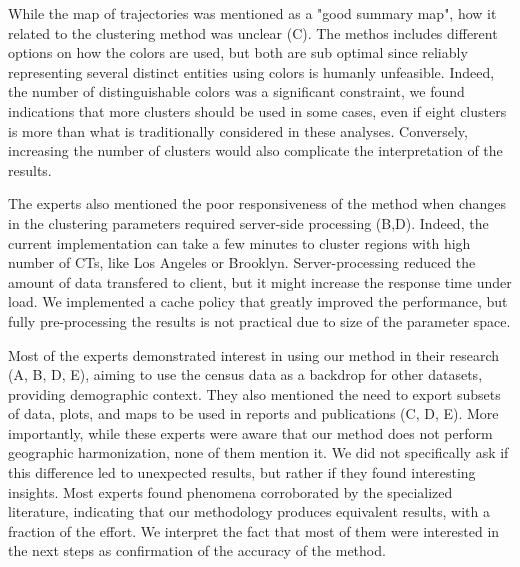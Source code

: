 While the map of trajectories was mentioned as a "good summary map", how it
related to the clustering method was unclear (C). The methos includes different
options on how the colors are used, but both are sub optimal since reliably
representing several distinct entities using colors is humanly unfeasible.
Indeed, the number of distinguishable colors was a significant constraint, we
found indications that more clusters should be used in some cases, even if eight
clusters is more than what is traditionally considered in these analyses.
Conversely, increasing the number of clusters would also complicate the
interpretation of the results.


The experts also mentioned the poor responsiveness of the method when changes in
the clustering parameters required server-side processing (B,D). Indeed, the
current implementation can take a few minutes to cluster regions with high
number of CTs, like Los Angeles or Brooklyn. Server-processing reduced the
amount of data transfered to client, but it might increase the response time
under load. We implemented a cache policy that greatly improved the performance,
but fully pre-processing the results is not practical due to size of the
parameter space.

Most of the experts demonstrated interest in using our method in their research
(A, B, D, E), aiming to use the census data as a backdrop for other datasets,
providing demographic context. They also mentioned the need to export subsets of
data, plots, and maps to be used in reports and publications (C, D, E). More
importantly, while these experts were aware that our method does not perform
geographic harmonization, none of them mention it. We did not specifically ask
if this difference led to unexpected results, but rather if they found
interesting insights. Most experts found phenomena corroborated by the
specialized literature, indicating that our methodology produces equivalent
results, with a fraction of the effort. We interpret the fact that most of them
were interested in the next steps as confirmation of the accuracy of the method.